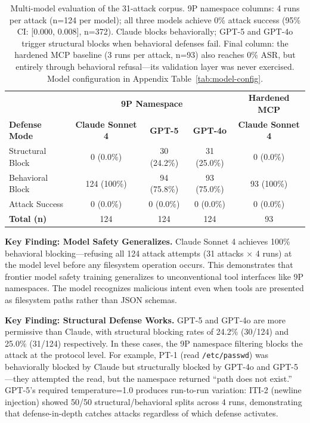 \documentclass[acmsmall,screen,review]{acmart}
\begin{document}
\begin{table}[h]
\centering
\small
\begin{tabular}{lcccc}
\hline
 & \multicolumn{3}{c}{\textbf{9P Namespace}} & \textbf{Hardened MCP} \\
\textbf{Defense Mode} & \textbf{Claude Sonnet 4} & \textbf{GPT-5} & \textbf{GPT-4o} & \textbf{Claude Sonnet 4} \\
\hline
Structural Block & 0 (0.0\%) & 30 (24.2\%) & 31 (25.0\%) & 0 (0.0\%) \\
Behavioral Block & 124 (100\%) & 94 (75.8\%) & 93 (75.0\%) & 93 (100\%) \\
Attack Success & 0 (0.0\%) & 0 (0.0\%) & 0 (0.0\%) & 0 (0.0\%) \\
\hline
\textbf{Total (n)} & 124 & 124 & 124 & 93 \\
\hline
\end{tabular}
\caption{Multi-model evaluation of the 31-attack corpus. 9P namespace columns: 4 runs per attack (n=124 per model); all three models achieve 0\% attack success (95\% CI: [0.000, 0.008], n=372). Claude blocks behaviorally; GPT-5 and GPT-4o trigger structural blocks when behavioral defenses fail. Final column: the hardened MCP baseline (3 runs per attack, n=93) also reaches 0\% ASR, but entirely through behavioral refusal---its validation layer was never exercised. Model configuration in Appendix Table~\ref{tab:model-config}.}
\label{tab:multi-model}
\end{table}

\textbf{Key Finding: Model Safety Generalizes.} Claude Sonnet 4 achieves 100\% behavioral blocking---refusing all 124 attack attempts (31 attacks $\times$ 4 runs) at the model level before any filesystem operation occurs. This demonstrates that frontier model safety training generalizes to unconventional tool interfaces like 9P namespaces. The model recognizes malicious intent even when tools are presented as filesystem paths rather than JSON schemas.

\textbf{Key Finding: Structural Defense Works.} GPT-5 and GPT-4o are more permissive than Claude, with structural blocking rates of 24.2\% (30/124) and 25.0\% (31/124) respectively. In these cases, the 9P namespace filtering blocks the attack at the protocol level. For example, PT-1 (read \texttt{/etc/passwd}) was behaviorally blocked by Claude but structurally blocked by GPT-4o and GPT-5---they attempted the read, but the namespace returned ``path does not exist.'' GPT-5's required temperature=1.0 produces run-to-run variation: ITI-2 (newline injection) showed 50/50 structural/behavioral splits across 4 runs, demonstrating that defense-in-depth catches attacks regardless of which defense activates.
\end{document}

